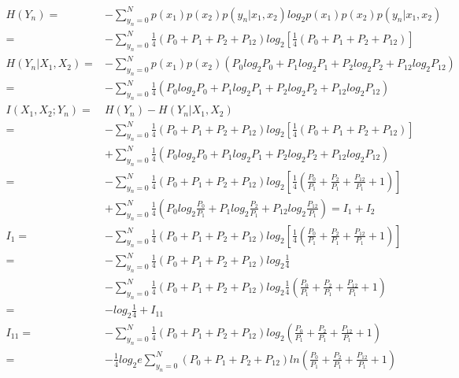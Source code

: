 \documentclass[12pt]{article}
\begin{document}
\begin{equation*}
    \begin{aligned}
       H(Y_n)=&-\sum_{y_n=0}^Np(x_1)p(x_2)p(y_n|x_1,x_2)log_2p(x_1)p(x_2)p(y_n|x_1,x_2)\\
       =&-\sum_{y_n=0}^N\frac{1}{4}(P_0+P_1+P_2+P_{12})log_2\left[\frac{1}{4}\left(P_0+P_1+P_2+P_{12}\right)\right] \\
       H(Y_n|X_1,X_2) =& -\sum_{y_n=0}^Np(x_1)p(x_2)\left(P_{0}log_2P_{0}+P_{1}log_2P_{1}+P_{2}log_2P_{2}+P_{12}log_2P_{12}\right) \\
       =& -\sum_{y_n=0}^N\frac{1}{4}(P_{0}log_2P_{0}+P_{1}log_2P_{1}+P_{2}log_2P_{2}+P_{12}log_2P_{12}) \\
       I(X_1,X_2;Y_n)=&H(Y_n)-H(Y_n|X_1,X_2) \\
       =&-\sum_{y_n=0}^N\frac{1}{4}(P_0+P_1+P_2+P_{12})log_2\left[\frac{1}{4}\left(P_0+P_1+P_2+P_{12}\right)\right] \\
       &+\sum_{y_n=0}^N\frac{1}{4}(P_{0}log_2P_{0}+P_{1}log_2P_{1}+P_{2}log_2P_{2}+P_{12}log_2P_{12}) \\
       =&-\sum_{y_n=0}^N\frac{1}{4}(P_0+P_1+P_2+P_{12})log_2\left[\frac{1}{4}\left(\frac{P_0}{P_1}+\frac{P_2}{P_1}+\frac{P_{12}}{P_1}+1\right)\right] \\
       &+ \sum_{y_n=0}^N\frac{1}{4}(P_{0}log_2\frac{P_0}{P_1}+P_{1}log_2\frac{P_2}{P_1}+P_{12}log_2\frac{P_{12}}{P_1}) = I_1+I_2 \\
       I_1=&-\sum_{y_n=0}^N\frac{1}{4}(P_0+P_1+P_2+P_{12})log_2\left[\frac{1}{4}\left(\frac{P_0}{P_1}+\frac{P_2}{P_1}+\frac{P_{12}}{P_1}+1\right)\right] \\
       =& -\sum_{y_n=0}^N\frac{1}{4}(P_0+P_1+P_2+P_{12})log_2\frac{1}{4}\\
       &-\sum_{y_n=0}^N\frac{1}{4}(P_0+P_1+P_2+P_{12})log_2\frac{1}{4}\left(\frac{P_0}{P_1}+\frac{P_2}{P_1}+\frac{P_{12}}{P_1}+1\right)\\
       =& -log_2\frac{1}{4}+I_{11}\\
       I_{11}=&-\sum_{y_n=0}^N\frac{1}{4}(P_0+P_1+P_2+P_{12})log_2\left(\frac{P_0}{P_1}+\frac{P_2}{P_1}+\frac{P_{12}}{P_1}+1\right) \\
       =& -\frac{1}{4}log_2e\sum_{y_n=0}^N(P_0+P_1+P_2+P_{12})ln\left(\frac{P_0}{P_1}+\frac{P_2}{P_1}+\frac{P_{12}}{P_1}+1\right) 
       
    \end{aligned}
\end{equation*}
\end{document}
